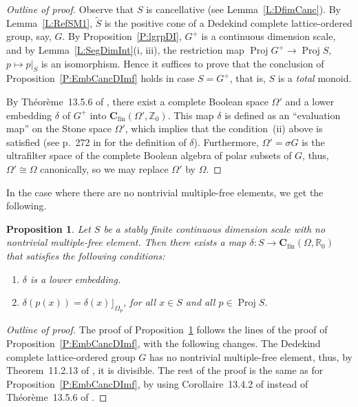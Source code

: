 \documentclass[psamsfonts,reqno]{memo-l}
\theoremstyle{plain}
\newtheorem{proposition}[lemma]{Proposition}
\theoremstyle{definition}
\theoremstyle{remark}
\numberwithin{equation}{section}
\newcommand{\CC}{\mathbf{C}}
\newcommand{\Ref}[1]{\widetilde{#1}}
\newcommand{\fin}{\mathrm{fin}}
\newcommand{\ZZ}{\mathbb{Z}}
\newcommand{\RR}{\mathbb{R}}
\DeclareMathOperator{\BB}{Proj}
\begin{document}
\begin{proof}[Outline of proof]
Observe that $S$ is cancellative (see
Lemma~\ref{L:DfimCanc}). By Lemma~\ref{L:RefSM1}, $\Ref S$ is the positive
cone of a Dedekind complete lattice-ordered group, say, $G$. By
Proposition~\ref{P:lgrpDI},
$G^+$ is a continuous dimension scale, and by
Lemma~\ref{L:SegDimInt}(i, iii), the restriction map\index{pzzroj@$\BB{S}$}
$\BB{G^+}\to\BB{S}$,
$p\mapsto p|_S$ is an isomorphism. Hence it suffices to prove that the
conclusion of Proposition~\ref{P:EmbCancDImf} holds in case $S=G^+$, that
is, $S$ is a \emph{total} monoid.

By Th\'eor\`eme~13.5.6 of
%
\cite{BKW}, there exist a complete
Boolean space $\Omega'$ and a lower
embedding
$\delta$ of $G^+$ into $\CC_{\fin}(\Omega',\ZZ_0)$. This map $\delta$ is
defined as an ``evaluation map'' on the Stone space
$\Omega'$, which implies that the condition~(ii) above is satisfied (see
p.~272 in
%
\cite{BKW} for the definition of $\delta$). Furthermore, $\Omega'=\sigma G$
is the ultrafilter space of the complete Boolean algebra
 of polar subsets of
$G$, thus, $\Omega'\cong\Omega$ canonically, so we may replace $\Omega'$ by
$\Omega$.
\end{proof}

In the case where there are no nontrivial multiple-free elements, we get the
following.

\begin{proposition}\label{P:EmbCancDIdiv}
Let $S$ be a stably finite continuous dimension scale with no nontrivial multiple-free element.
Then there exists a map
$\delta\colon S\to\CC_{\fin}(\Omega,\RR_0)$ that satisfies the
following conditions:
\begin{enumerate}
\item $\delta$ is a lower embedding.

\item $\delta(p(x))=\delta(x)\rfloor_{\Omega_p}$, for all $x\in S$ and
all\index{pzzroj@$\BB{S}$}
$p\in\BB{S}$.
\end{enumerate}
\end{proposition}

\begin{proof}[Outline of proof]
The proof of Proposition~\ref{P:EmbCancDIdiv} follows the lines of the proof
of Proposition~\ref{P:EmbCancDImf}, with the following changes. The Dedekind
complete lattice-ordered group $G$ has no nontrivial multiple-free
element, thus, by Theorem~11.2.13 of
%
\cite{BKW}, it is divisible. The rest
of the proof is the same as for Proposition~\ref{P:EmbCancDImf}, by using
Corollaire~13.4.2 of
%
\cite{BKW} instead of Th\'eor\`eme~13.5.6 of \cite{BKW}.
\end{proof}
\end{document}
